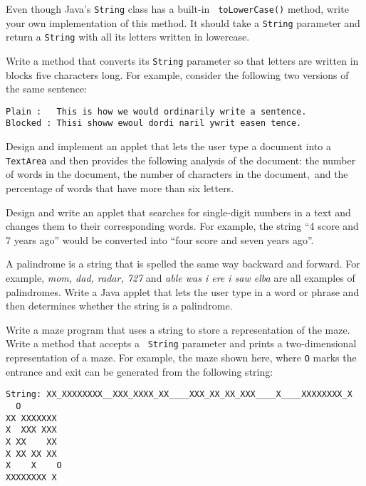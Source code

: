 \begin{EXRtwo}
\item Even though Java's {\tt String} class has a built-in {\tt
toLowerCase()} method, write your own implementation of this method.
It should take a {\tt String} parameter and return a {\tt String}
with all its letters written in lowercase.

\item Write a method that converts its {\tt String} parameter so that
letters are written in blocks five characters long.  For example,
consider the following two versions of the same sentence:

\begin{jjjlisting}
\begin{lstlisting}
Plain :   This is how we would ordinarily write a sentence.
Blocked : Thisi showw ewoul dordi naril ywrit easen tence.
\end{lstlisting}
\end{jjjlisting}

\item  Design and implement an applet that lets the user type a document
into a {\tt TextArea} and then provides the following analysis of the
document: the number of words in the document, the number of
characters in the document,~and the percentage of words that have more
than six letters.

\item  Design and write an applet that searches for single-digit numbers
in a text and changes them to their corresponding words.  For example,
the string ``4 score and 7 years ago'' would be converted into ``four
score and seven years ago''.

\item  A palindrome is a string that is spelled the same way backward
and forward.  For example, {\it mom, dad, radar, 727} and
{\it able was i ere i saw elba} are all examples of palindromes.
Write a Java applet that lets the user type in a word or phrase
and then determines whether the string is a palindrome.

\item Write a maze program that uses a string to store a
representation of the maze.  Write a method that accepts a {\tt
String} parameter and prints a two-dimensional representation of a
maze. For example, the maze shown here, where {\tt O} marks the
entrance and exit can be generated from the following string:

\begin{jjjlisting}
\begin{lstlisting}[basicstyle=\scriptsize]
String: XX_XXXXXXXX__XXX_XXXX_XX____XXX_XX_XX_XXX____X____XXXXXXXX_X
  O
XX XXXXXXX
X  XXX XXX
X XX    XX
X XX XX XX
X    X    O
XXXXXXXX X
\end{lstlisting}
\end{jjjlisting}



\end{EXRtwo}
